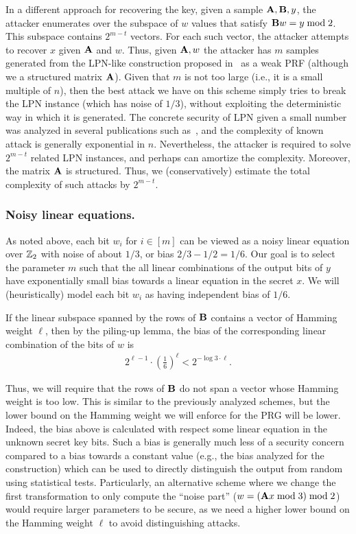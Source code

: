 In a different approach for recovering the key, given a sample $\mat{A},\mat{B},y$,
the attacker enumerates over the subspace of $w$ values that satisfy $\mat{B} w = y \bmod 2$.
This subspace contains $2^{m - t}$ vectors. For each such vector, the attacker attempts to recover $x$
given $\mat{A}$ and $w$. Thus, given $\mat{A},w$ the attacker has $m$ samples
generated from the LPN-like construction proposed in~\cite{boneh2018-darkmatter} as a weak PRF
(although we a structured matrix $\mat{A}$).
Given that $m$ is not too large (i.e., it is a small multiple of $n$),
then the best attack we have on this scheme simply tries to break the LPN instance (which has noise of $1/3$),
without exploiting the deterministic way in which it is generated.
The concrete security of LPN given a small number was analyzed in several publications such as~\cite{EsserKM17},
and the complexity of known attack is generally exponential in $n$.
Nevertheless, the attacker is required to solve $2^{m - t}$ related LPN instances,
and perhaps can amortize the complexity. Moreover, the matrix $\mat{A}$ is structured.
Thus, we (conservatively) estimate the total complexity of such attacks by $2^{m - t}$.

\subsubsection{Noisy linear equations.}

As noted above, each bit $w_i$ for $i \in [m]$ can be viewed as a noisy linear equation over $\mathbb{Z}_2$
with noise of about $1/3$, or bias $2/3 - 1/2 = 1/6$.
Our goal is to select the parameter $m$ such that
the all linear combinations of the output bits of $y$
have exponentially small bias towards a linear equation in the secret $x$.
We will (heuristically) model each bit $w_i$ as having independent bias of $1/6$.

If the linear subspace spanned by the rows of $\mat{B}$ contains a vector of Hamming weight $\ell$,
then by the piling-up lemma, the bias of the corresponding linear combination of the bits of $w$ is
\begin{align}\label{eq:bias_linear}
2^{\ell - 1} \cdot (\tfrac{1}{6})^{\ell} < 2^{-\log 3 \cdot \ell}.
\end{align}

Thus, we will require
that the rows of $\mat{B}$ do not span a vector whose Hamming weight is too low.
This is similar to the previously analyzed schemes,
but the lower bound on the Hamming weight we will enforce for the PRG will be lower.
Indeed, the bias above is calculated with respect some linear equation in the unknown secret key bits.
Such a bias is generally much less of a security concern compared to a bias towards a constant value
(e.g., the bias analyzed for the \ttwPRF construction) which can be used
to directly distinguish the output from random using statistical tests.
Particularly, an alternative scheme where we change the first transformation
to only compute the ``noise part''
($w =(\mat{A}x \bmod 3) \bmod 2$) would require larger parameters to be secure,
as we need a higher lower bound on the Hamming weight $\ell$ to avoid distinguishing attacks.


